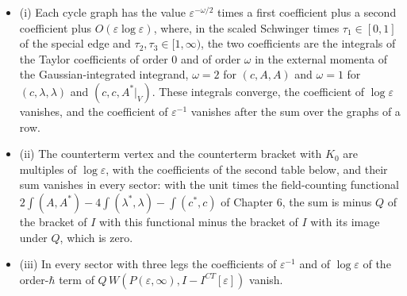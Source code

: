 \begin{theorem}
\label{thm:c9-sing}
\begin{itemize}
\item (i) Each cycle graph has the value $\varepsilon^{-\omega/2}$ times a first coefficient plus a second coefficient plus $O(\varepsilon\log\varepsilon)$, where, in the scaled Schwinger times $\tau_1\in[0,1]$ of the special edge and $\tau_2,\tau_3\in[1,\infty)$, the two coefficients are the integrals of the Taylor coefficients of order $0$ and of order $\omega$ in the external momenta of the Gaussian-integrated integrand, $\omega=2$ for $(c,A,A)$ and $\omega=1$ for $(c,\lambda,\lambda)$ and $(c,c,A^*|_V)$. These integrals converge, the coefficient of $\log\varepsilon$ vanishes, and the coefficient of $\varepsilon^{-1}$ vanishes after the sum over the graphs of a row.
\item (ii) The counterterm vertex and the counterterm bracket with $K_0$ are multiples of $\log\varepsilon$, with the coefficients of the second table below, and their sum vanishes in every sector: with the unit times the field-counting functional $2\int(A,A^*)-4\int(\lambda^*,\lambda)-\int(c^*,c)$ of Chapter 6, the sum is minus $Q$ of the bracket of $I$ with this functional minus the bracket of $I$ with its image under $Q$, which is zero.
\item (iii) In every sector with three legs the coefficients of $\varepsilon^{-1}$ and of $\log\varepsilon$ of the order-$\hbar$ term of $Q\,W(P(\varepsilon,\infty),I-I^{CT}[\varepsilon])$ vanish.
\end{itemize}
\end{theorem}

